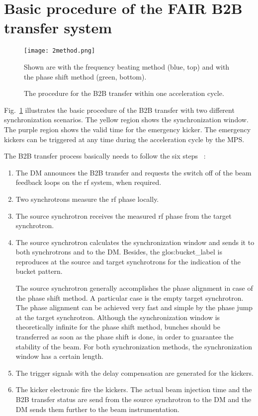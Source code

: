 \section{Basic procedure of the FAIR B2B transfer system}
\begin{figure}[!htb]
   \centering   
   \texttt{[image: 2method.png]}
   \caption{The procedure for the B2B transfer within one acceleration cycle.}{Shown are with the frequency beating method (blue, top) and with the phase shift method (green, bottom).}
   \label{2method}
\end{figure}
Fig.~\ref{2method} illustrates the basic procedure of the B2B transfer with two different synchronization scenarios. The yellow region shows the synchronization window. The purple region shows the valid time for the emergency kicker. The emergency kickers can be triggered at any time during the acceleration cycle by the MPS.  


The B2B transfer process basically needs to follow the six steps ~\cite{bai_bunch_2015}:
\begin{enumerate}
\item The DM announces the B2B transfer and requests the switch off of the beam feedback loops on the rf system, when required.
\item Two synchrotrons measure the rf phase locally.
\item The source synchrotron receives the measured rf phase from the target synchrotron.
\item The source synchrotron calculates the synchronization window and sends it to both synchrotrons and to the DM. Besides, the \gls{glos:bucket_label} is reproduces at the source and target synchrotrons for the indication of the bucket pattern.

The source synchrotron generally accomplishes the phase alignment in case of the phase shift method. A particular case is the empty target synchrotron. The phase alignment can be achieved very fast and simple by the phase jump at the target synchrotron. Although the synchronization window is theoretically infinite for the phase shift method, bunches should be transferred as soon as the phase shift is done, in order to guarantee the stability of the beam. For both synchronization methods, the synchronization window has a certain length.

\item The trigger signals with the delay compensation are generated for the kickers.
\item The kicker electronic fire the kickers. The actual beam injection time and the B2B transfer status are send from the source synchrotron to the DM and the DM sends them further to the beam instrumentation.

\end{enumerate}



